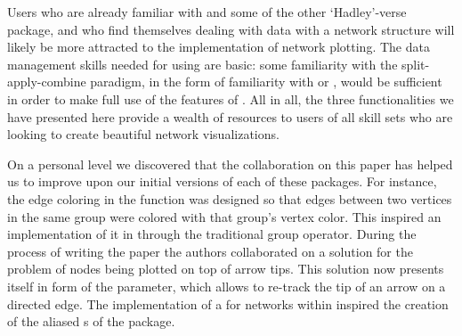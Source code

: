 Users who are already familiar with  and some of the other `Hadley'-verse package, and who find themselves dealing with data with a network structure will likely be more attracted to the  implementation of network plotting. The data management skills needed for using are basic: some familiarity with the split-apply-combine paradigm, in the form of familiarity with  or , would be sufficient in order to make full use of the features of . All in all, the three functionalities we have presented here provide a wealth of resources to users of all skill sets who are looking to create beautiful network visualizations.


On a personal level we discovered that the collaboration on this paper has helped us to improve upon our initial versions of each of these packages. For instance, the edge coloring in the  function was designed so that edges between two vertices in the same group were colored with that group's vertex color. This  inspired an implementation of it in  through the traditional  group operator. During the process of writing the paper the authors collaborated on a solution for the problem of nodes being plotted on top of arrow tips. This solution now presents itself in form of the  parameter, which allows to re-track the tip of an arrow on a directed edge.
The implementation of a   for networks within  inspired the creation of the aliased s of the  package. 




